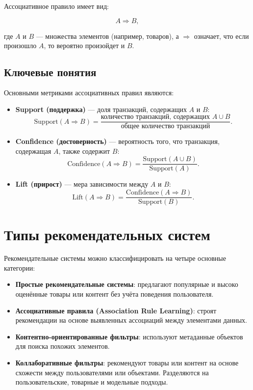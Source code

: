 Ассоциативное правило имеет вид:

\begin{equation}
A \Rightarrow B,
\end{equation}

где $A$ и $B$ — множества элементов (например, товаров), а $\Rightarrow$ означает, что если произошло $A$, то вероятно произойдет и $B$.

\subsection{Ключевые понятия}

Основными метриками ассоциативных правил являются:

\begin{itemize}
  \item \textbf{Support (поддержка)} — доля транзакций, содержащих $A$ и $B$:
    \[\text{Support}(A \Rightarrow B) = \frac{\text{количество транзакций, содержащих } A \cup B}{\text{общее количество транзакций}}.\]
  \item \textbf{Confidence (достоверность)} — вероятность того, что транзакция, содержащая $A$, также содержит $B$:
    \[\text{Confidence}(A \Rightarrow B) = \frac{\text{Support}(A \cup B)}{\text{Support}(A)}.\]
  \item \textbf{Lift (прирост)} — мера зависимости между $A$ и $B$:
    \[\text{Lift}(A \Rightarrow B) = \frac{\text{Confidence}(A \Rightarrow B)}{\text{Support}(B)}.\]
\end{itemize}

\section{Типы рекомендательных систем}

Рекомендательные системы можно классифицировать на четыре основные категории:

\begin{itemize}
    \item \textbf{Простые рекомендательные системы}: предлагают популярные и высоко оценённые товары или контент без учёта поведения пользователя.
    \item \textbf{Ассоциативные правила (Association Rule Learning)}: строят рекомендации на основе выявленных ассоциаций между элементами данных.
    \item \textbf{Контентно-ориентированные фильтры}: используют метаданные объектов для поиска похожих элементов.
    \item \textbf{Коллаборативные фильтры}: рекомендуют товары или контент на основе схожести между пользователями или объектами. Разделяются на пользовательские, товарные и модельные подходы.
\end{itemize}

